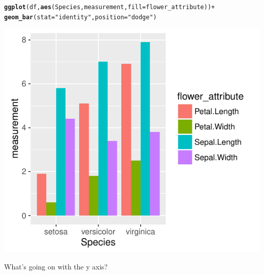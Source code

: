 \documentclass{beamer}\usepackage[]{graphicx}\usepackage[]{color}
\makeatletter
\newcommand{\hlstr}[1]{\textcolor[rgb]{0.192,0.494,0.8}{#1}}%
\newcommand{\hlopt}[1]{\textcolor[rgb]{0,0,0}{#1}}%
\newcommand{\hlstd}[1]{\textcolor[rgb]{0.345,0.345,0.345}{#1}}%
\newcommand{\hlkwc}[1]{\textcolor[rgb]{0.333,0.667,0.333}{#1}}%
\newcommand{\hlkwd}[1]{\textcolor[rgb]{0.737,0.353,0.396}{\textbf{#1}}}%
\newenvironment{kframe}{%
 \def\at@end@of@kframe{}%
 \ifinner\ifhmode%
  \def\at@end@of@kframe{\end{minipage}}%
  \begin{minipage}{\columnwidth}%
 \fi\fi%
 \def\FrameCommand##1{\hskip\@totalleftmargin \hskip-\fboxsep
 \colorbox{shadecolor}{##1}\hskip-\fboxsep
     \hskip-\linewidth \hskip-\@totalleftmargin \hskip\columnwidth}%
 \MakeFramed {\advance\hsize-\width
   \@totalleftmargin\z@ \linewidth\hsize
   \@setminipage}}%
 {\par\unskip\endMakeFramed%
 \at@end@of@kframe}
\newenvironment{knitrout}{}{} %
\makeatother
\begin{document}
\begin{frame}[fragile]
\begin{knitrout}\footnotesize
{}\color{fgcolor}\begin{kframe}
\begin{alltt}
\hlkwd{ggplot}\hlstd{(df,} \hlkwd{aes}\hlstd{(Species, measurement,} \hlkwc{fill} \hlstd{= flower_attribute))} \hlopt{+}
    \hlkwd{geom_bar}\hlstd{(}\hlkwc{stat} \hlstd{=} \hlstr{"identity"}\hlstd{,} \hlkwc{position} \hlstd{=} \hlstr{"dodge"}\hlstd{)}
\end{alltt}
\end{kframe}

{\centering \includegraphics[width=.75\linewidth]{figure/barthree-1} 

}



\end{knitrout}
What's going on with the y axis?
\end{frame}

\end{document}
